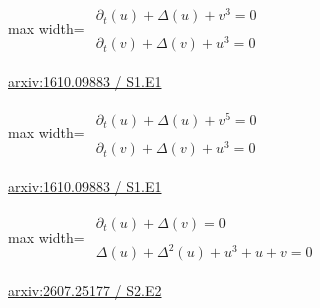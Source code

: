 \documentclass[10pt,a4paper]{article}
\begin{document}
\begin{minipage}{\linewidth}
\begin{center}\begin{adjustbox}{max width=\linewidth}$\displaystyle\begin{gathered}\begin{gathered}\partial_{t}(u)+\Delta(u)+v^{3}=0\end{gathered}\\[5pt]\begin{gathered}\partial_{t}(v)+\Delta(v)+u^{3}=0\end{gathered}\end{gathered}$\end{adjustbox}\end{center}
{\small \href{https://arxiv.org/html/1610.09883#S1.E1}{arxiv:1610.09883 / S1.E1}}\par
\end{minipage}\par\vspace{7mm}

\begin{minipage}{\linewidth}
\begin{center}\begin{adjustbox}{max width=\linewidth}$\displaystyle\begin{gathered}\begin{gathered}\partial_{t}(u)+\Delta(u)+v^{5}=0\end{gathered}\\[5pt]\begin{gathered}\partial_{t}(v)+\Delta(v)+u^{3}=0\end{gathered}\end{gathered}$\end{adjustbox}\end{center}
{\small \href{https://arxiv.org/html/1610.09883#S1.E1}{arxiv:1610.09883 / S1.E1}}\par
\end{minipage}\par\vspace{7mm}

\begin{minipage}{\linewidth}
\begin{center}\begin{adjustbox}{max width=\linewidth}$\displaystyle\begin{gathered}\begin{gathered}\partial_{t}(u)+\Delta(v)=0\end{gathered}\\[5pt]\begin{gathered}\Delta(u)+\Delta^{2}(u)+u^{3}+u+v=0\end{gathered}\end{gathered}$\end{adjustbox}\end{center}
{\small \href{https://arxiv.org/html/2607.25177#S2.E2}{arxiv:2607.25177 / S2.E2}}\par
\end{minipage}\par\vspace{7mm}
\end{document}
